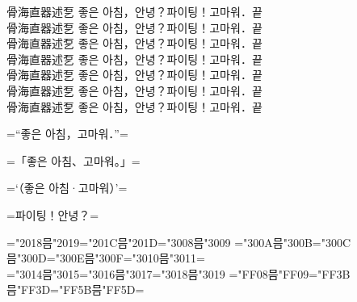 \documentclass[landscape]{utarticle}
\begin{document}
\upkorrml 骨海直器述乭 좋은 아침，안녕？파이팅！고마워．끝\\
\upkorrmm 骨海直器述乭 좋은 아침，안녕？파이팅！고마워．끝\\
\upkorrmb 骨海直器述乭 좋은 아침，안녕？파이팅！고마워．끝\\
\upkorgtm 骨海直器述乭 좋은 아침，안녕？파이팅！고마워．끝\\
\upkorgtb 骨海直器述乭 좋은 아침，안녕？파이팅！고마워．끝\\
\upkorgte 骨海直器述乭 좋은 아침，안녕？파이팅！고마워．끝\\
\upkorgth 骨海直器述乭 좋은 아침，안녕？파이팅！고마워．끝\\

\upkorrmm

=“좋은 아침，고마워．”=

=「좋은 아침、고마워。」=

=‘（좋은 아침·고마워）’=

=파이팅！안녕？=

=\kchar"2018믐\kchar"2019=\kchar"201C믐\kchar"201D=\kchar"3008믐\kchar"3009%
=\kchar"300A믐\kchar"300B=\kchar"300C믐\kchar"300D=\kchar"300E믐\kchar"300F=\kchar"3010믐\kchar"3011=\\
=\kchar"3014믐\kchar"3015=\kchar"3016믐\kchar"3017=\kchar"3018믐\kchar"3019%
=\kchar"FF08믐\kchar"FF09=\kchar"FF3B믐\kchar"FF3D=\kchar"FF5B믐\kchar"FF5D=
\end{document}
